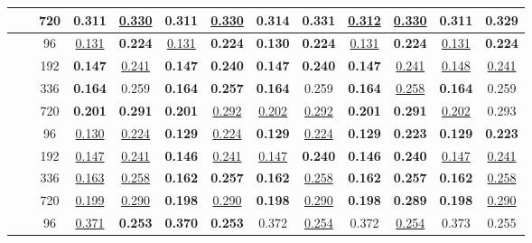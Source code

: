 \begin{table*}[!ht]
{\begin{tabular}{c|c|c|cc|cc|cc|cc|cc}
    		 & & 720 &  \textbf{0.311} & \underline{0.330} &  \textbf{0.311} & \underline{0.330} &  0.314 & 0.331 &  \underline{0.312} & \underline{0.330} &  \textbf{0.311} & \textbf{0.329} \\
    	\midrule
    	\multirow{8}{*}{\rotatebox[origin=c]{90}{\text{Electricity}}}
    	& \multirow{4}{*}{\rotatebox[origin=c]{90}{\text{336}}}
    		 & 96 &  \underline{0.131} & \textbf{0.224} &  \underline{0.131} & \textbf{0.224} &  \textbf{0.130} & \textbf{0.224} &  \underline{0.131} & \textbf{0.224} &  \underline{0.131} & \textbf{0.224} \\
    		 & & 192 &  \textbf{0.147} & \underline{0.241} &  \textbf{0.147} & \textbf{0.240} &  \textbf{0.147} & \textbf{0.240} &  \textbf{0.147} & \underline{0.241} &  \underline{0.148} & \underline{0.241} \\
    		 & & 336 &  \textbf{0.164} & 0.259 &  \textbf{0.164} & \textbf{0.257} &  \textbf{0.164} & 0.259 &  \textbf{0.164} & \underline{0.258} &  \textbf{0.164} & 0.259 \\
    		 & & 720 &  \textbf{0.201} & \textbf{0.291} &  \textbf{0.201} & \underline{0.292} &  \underline{0.202} & \underline{0.292} &  \textbf{0.201} & \textbf{0.291} &  \underline{0.202} & 0.293 \\ \cmidrule{2-13}
    	& \multirow{4}{*}{\rotatebox[origin=c]{90}{\text{512}}}
    		 & 96 &  \underline{0.130} & \underline{0.224} &  \textbf{0.129} & \underline{0.224} &  \textbf{0.129} & \underline{0.224} &  \textbf{0.129} & \textbf{0.223} &  \textbf{0.129} & \textbf{0.223} \\
    		 & & 192 &  \underline{0.147} & \underline{0.241} &  \textbf{0.146} & \underline{0.241} &  \underline{0.147} & \textbf{0.240} &  \textbf{0.146} & \textbf{0.240} &  \underline{0.147} & \underline{0.241} \\
    		 & & 336 &  \underline{0.163} & \underline{0.258} &  \textbf{0.162} & \textbf{0.257} &  \textbf{0.162} & \underline{0.258} &  \textbf{0.162} & \textbf{0.257} &  \textbf{0.162} & \underline{0.258} \\
    		 & & 720 &  \underline{0.199} & \underline{0.290} &  \textbf{0.198} & \underline{0.290} &  \textbf{0.198} & \underline{0.290} &  \textbf{0.198} & \textbf{0.289} &  \textbf{0.198} & \underline{0.290} \\
    	\midrule
    	\multirow{8}{*}{\rotatebox[origin=c]{90}{\text{Traffic}}}
    	& \multirow{4}{*}{\rotatebox[origin=c]{90}{\text{336}}}
    		 & 96 &  \underline{0.371} & \textbf{0.253} &  \textbf{0.370} & \textbf{0.253} &  0.372 & \underline{0.254} &  0.372 & \underline{0.254} &  0.373 & 0.255 \\

\end{tabular}}
\end{table*}
